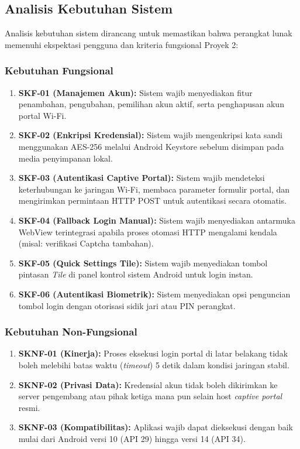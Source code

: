 \subsection{Analisis Kebutuhan Sistem}
Analisis kebutuhan sistem dirancang untuk memastikan bahwa perangkat lunak memenuhi ekspektasi pengguna dan kriteria fungsional Proyek 2:

\subsubsection{Kebutuhan Fungsional}
\begin{enumerate}
    \item \textbf{SKF-01 (Manajemen Akun):} Sistem wajib menyediakan fitur penambahan, pengubahan, pemilihan akun aktif, serta penghapusan akun portal Wi-Fi.
    \item \textbf{SKF-02 (Enkripsi Kredensial):} Sistem wajib mengenkripsi kata sandi menggunakan AES-256 melalui Android Keystore sebelum disimpan pada media penyimpanan lokal.
    \item \textbf{SKF-03 (Autentikasi Captive Portal):} Sistem wajib mendeteksi keterhubungan ke jaringan Wi-Fi, membaca parameter formulir portal, dan mengirimkan permintaan HTTP POST untuk autentikasi secara otomatis.
    \item \textbf{SKF-04 (Fallback Login Manual):} Sistem wajib menyediakan antarmuka WebView terintegrasi apabila proses otomasi HTTP mengalami kendala (misal: verifikasi Captcha tambahan).
    \item \textbf{SKF-05 (Quick Settings Tile):} Sistem wajib menyediakan tombol pintasan \textit{Tile} di panel kontrol sistem Android untuk login instan.
    \item \textbf{SKF-06 (Autentikasi Biometrik):} Sistem menyediakan opsi penguncian tombol login dengan otorisasi sidik jari atau PIN perangkat.
\end{enumerate}

\subsubsection{Kebutuhan Non-Fungsional}
\begin{enumerate}
    \item \textbf{SKNF-01 (Kinerja):} Proses eksekusi login portal di latar belakang tidak boleh melebihi batas waktu (\textit{timeout}) 5 detik dalam kondisi jaringan stabil.
    \item \textbf{SKNF-02 (Privasi Data):} Kredensial akun tidak boleh dikirimkan ke server pengembang atau pihak ketiga mana pun selain host \textit{captive portal} resmi.
    \item \textbf{SKNF-03 (Kompatibilitas):} Aplikasi wajib dapat dieksekusi dengan baik mulai dari Android versi 10 (API 29) hingga versi 14 (API 34).
\end{enumerate}

